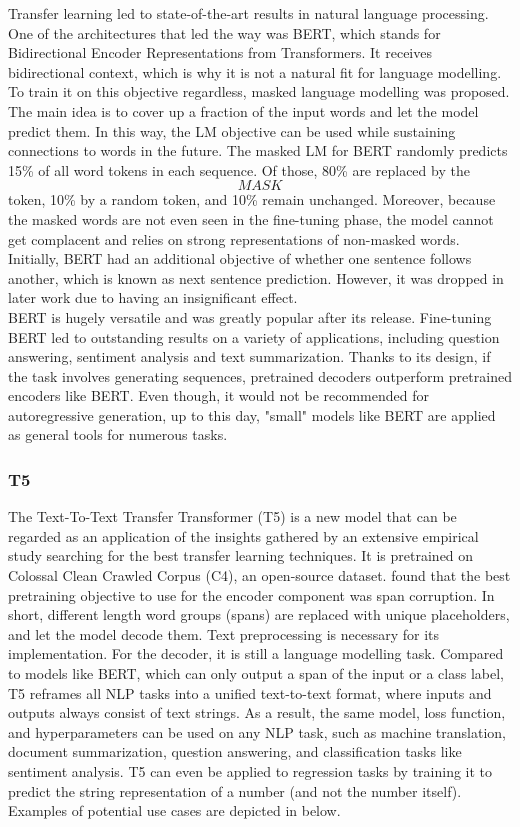 \documentclass[
]{krantz}
\begin{document}
Transfer learning led to state-of-the-art results in natural language
processing. One of the architectures that led the way was BERT, which
stands for Bidirectional Encoder Representations from Transformers. It
receives bidirectional context, which is why it is not a natural fit for
language modelling. To train it on this objective regardless, masked
language modelling was proposed. The main idea is to cover up a fraction
of the input words and let the model predict them. In this way, the LM
objective can be used while sustaining connections to words in the
future. The masked LM for BERT randomly predicts 15\% of all word tokens
in each sequence. Of those, 80\% are replaced by the \[MASK\] token, 10\%
by a random token, and 10\% remain unchanged. Moreover, because the
masked words are not even seen in the fine-tuning phase, the model
cannot get complacent and relies on strong representations of non-masked
words. Initially, BERT had an additional objective of whether one
sentence follows another, which is known as next sentence prediction.
However, it was dropped in later work due to having an insignificant
effect.\\
BERT is hugely versatile and was greatly popular after its release.
Fine-tuning BERT led to outstanding results on a variety of
applications, including question answering, sentiment analysis and text
summarization. Thanks to its design, if the task involves generating
sequences, pretrained decoders outperform pretrained encoders like BERT.
Even though, it would not be recommended for autoregressive generation,
up to this day, "small" models like BERT are applied as general tools
for numerous tasks.

\hypertarget{t5}{%
\subsubsection{T5}\label{t5}}

The Text-To-Text Transfer Transformer (T5) is a new model that can be
regarded as an application of the insights gathered by an extensive
empirical study searching for the best transfer learning techniques. It
is pretrained on Colossal Clean Crawled Corpus (C4), an open-source
dataset. \citep{Raffel2019} found that the best pretraining objective to use
for the encoder component was span corruption. In short, different
length word groups (spans) are replaced with unique placeholders, and
let the model decode them. Text preprocessing is necessary for its
implementation. For the decoder, it is still a language modelling task.
Compared to models like BERT, which can only output a span of the input
or a class label, T5 reframes all NLP tasks into a unified text-to-text
format, where inputs and outputs always consist of text strings. As a
result, the same model, loss function, and hyperparameters can be used
on any NLP task, such as machine translation, document summarization,
question answering, and classification tasks like sentiment analysis. T5
can even be applied to regression tasks by training it to predict the
string representation of a number (and not the number itself). Examples
of potential use cases are depicted in below.
\end{document}
